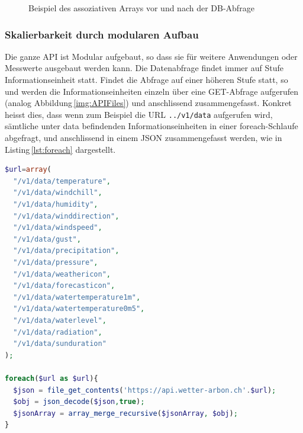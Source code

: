 \begin{figure}[htbp!]
	\centering
	\caption{Beispiel des assoziativen Arrays vor und nach der DB-Abfrage}
	\label{img:assozArray}
\end{figure}


\noindent
{}


\subsubsection{Skalierbarkeit durch modularen Aufbau}
Die ganze API ist Modular aufgebaut, so dass sie für weitere Anwendungen oder Messwerte ausgebaut werden kann. Die Datenabfrage findet immer auf Stufe Informationseinheit statt. Findet die Abfrage auf einer höheren Stufe statt, so und werden die Informationseinheiten einzeln über eine GET-Abfrage aufgerufen (analog Abbildung\,\ref{img:APIFiles}) und anschlissend zusammengefasst. Konkret heisst dies, dass wenn zum Beispiel die URL \texttt{../v1/data} aufgerufen wird, sämtliche unter data befindenden Informationseinheiten in einer foreach-Schlaufe abgefragt, und anschlissend in einem JSON zusammengefasst werden, wie in Listing\,\ref{lst:foreach} dargestellt.

\vspace{3mm}
\begin{lstlisting}[label=lst:foreach,caption=Routing der URL auf die richtige DB-Abfrage, language=php, style=php]
$url=array(
  "/v1/data/temperature",
  "/v1/data/windchill",
  "/v1/data/humidity",
  "/v1/data/winddirection",
  "/v1/data/windspeed",
  "/v1/data/gust",
  "/v1/data/precipitation",
  "/v1/data/pressure",
  "/v1/data/weathericon",
  "/v1/data/forecasticon",
  "/v1/data/watertemperature1m",
  "/v1/data/watertemperature0m5",
  "/v1/data/waterlevel",
  "/v1/data/radiation",
  "/v1/data/sunduration"
);

foreach($url as $url){
  $json = file_get_contents('https://api.wetter-arbon.ch'.$url);
  $obj = json_decode($json,true);
  $jsonArray = array_merge_recursive($jsonArray, $obj);
}
\end{lstlisting}
\vspace{3mm}



